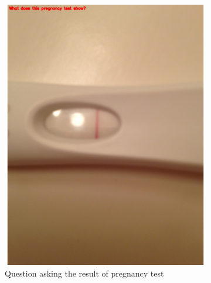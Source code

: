 \documentclass[sigconf]{acmart}
\begin{document}
\begin{figure}[hbp]
\begin{subfigure}[b]{0.3\columnwidth}
                \includegraphics[scale=0.2]{images/health_2.pdf}
                \caption{Question asking the result of pregnancy test}
                \label{fig:preg}
        \end{subfigure}%
        \begin{subfigure}[b]{0.3\columnwidth}

\end{subfigure}
\end{figure}
\end{document}
